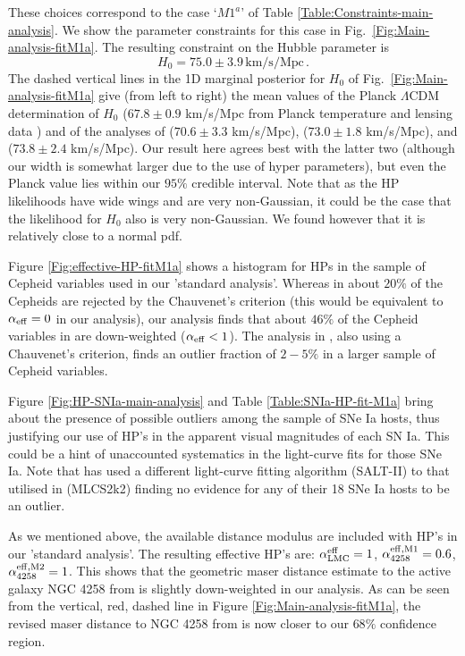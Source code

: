 These choices correspond to the case `$M1^{a}$' of Table \ref{Table:Constraints-main-analysis}. We show the parameter constraints for this case in Fig.\ \ref{Fig:Main-analysis-fitM1a}. The resulting constraint on the Hubble parameter is
\begin{equation}\label{Eq:H0-value-standard-analysis}
	H_0 = 75.0 \pm 3.9 \, \mathrm{km/s/Mpc} \, .
\end{equation}
The dashed vertical lines in the 1D marginal posterior for $H_0$ of Fig.\ \ref{Fig:Main-analysis-fitM1a} give (from left to right) the mean values of the Planck $\Lambda$CDM determination of $H_0$ ($67.8\pm0.9$ km/s/Mpc from Planck temperature and lensing data \cite{Ade:2015xua}) 
and of the analyses of \cite{Efstathiou:2013via} ($70.6\pm3.3$ km/s/Mpc), \cite{Riess:2016jrr} ($73.0\pm1.8$ km/s/Mpc), and \cite{Riess:2011yx} ($73.8\pm2.4$ km/s/Mpc). Our result here agrees best with the latter two (although our width is somewhat larger due to the use of hyper parameters), but even the Planck value lies within our $95\%$ credible interval. Note that as the HP likelihoods have wide wings and are very non-Gaussian, it could be the case that the likelihood for $H_0$ also is very
non-Gaussian. We found however that it is relatively close to a normal pdf.

Figure \ref{Fig:effective-HP-fitM1a} shows a histogram for HPs in the sample of Cepheid variables used in our 'standard analysis'. Whereas in \cite{Riess:2011yx} about $20\%$ of the Cepheids are rejected by the Chauvenet's criterion (this would be equivalent to $\alpha_{\mathrm{eff}}=0$ in our analysis), our analysis finds that about $46\%$ of the Cepheid variables in \cite{Riess:2011yx} are down-weighted ($\alpha_{\mathrm{eff}} <1$). The analysis in \cite{Riess:2016jrr}, also using a Chauvenet's criterion, finds an outlier fraction of $2-5\%$ in a larger sample of Cepheid variables.

Figure \ref{Fig:HP-SNIa-main-analysis} and Table \ref{Table:SNIa-HP-fit-M1a} bring about the presence of possible outliers among the sample of SNe Ia hosts, thus justifying our use of HP's in the apparent visual magnitudes of each SN Ia. This could be a hint of unaccounted systematics in the light-curve fits for those SNe Ia. Note that \cite{Riess:2016jrr} has used a different light-curve fitting algorithm (SALT-II) to that utilised in \cite{Riess:2011yx} (MLCS2k2) finding no evidence for any of their 18 SNe Ia hosts to be an outlier. 
 
As we mentioned above, the available distance modulus are included with HP's in our 'standard analysis'. The resulting effective HP's are: $\alpha^{\mathrm{eff}}_{\mathrm{LMC}}=1$, $\alpha^{\mathrm{eff},\rm M1}_{\rm 4258}=0.6$, $\alpha^{\mathrm{eff},\rm M2}_{\rm 4258}=1$. This shows that the geometric maser distance estimate to the active galaxy NGC 4258 from \cite{Humphreys:2013eja} is slightly down-weighted in our analysis.  As can be seen from the vertical, red, dashed line in Figure \ref{Fig:Main-analysis-fitM1a}, the revised maser distance to NGC 4258 from \cite{Riess:2016jrr} is now closer to our $68\%$ confidence region.     

